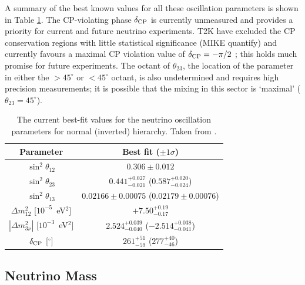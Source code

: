 A summary of the best known values for all these oscillation parameters is shown in Table \ref{tab:OscillationParameters}.  The CP-violating phase $\delta_{\textnormal{CP}}$ is currently unmeasured and provides a priority for current and future neutrino experiments.  T2K have excluded the CP conservation regions with little statistical significance (MIKE quantify) and currently favours a maximal CP violation value of $\delta_{\textnormal{CP}} = -\pi/2$ \cite{T2K2017}; this holds much promise for future experiments.  The octant of $\theta_{23}$, the location of the parameter in either the $> 45^{\circ}$ or $< 45^{\circ}$ octant, is also undetermined and requires high precision measurements; it is possible that the mixing in this sector is `maximal' ($\theta_{23} = 45^{\circ}$).

\begin{table}
  \caption[The current best-fit values for the neutrino oscillation parameters for normal and inverted hierarchies.]{The current best-fit values for the neutrino oscillation parameters for normal (inverted) hierarchy.  Taken from \cite{NuFit2017}.}
  \label{tab:OscillationParameters}
  \centering
    \begin{tabular}{c c}
      \toprule
      Parameter & Best fit ($\pm 1\sigma$) \\
      \midrule
      $\sin^2{\theta_{12}}$ & $0.306\pm0.012$ \\
      $\sin^2{\theta_{23}}$ & $0.441^{+0.027}_{-0.021}$ ($0.587^{+0.020}_{-0.024}$) \\
      $\sin^2{\theta_{13}}$ & $0.02166\pm0.00075$ ($0.02179\pm0.00076$) \\
      \midrule
      $\Delta m_{12}^2$ [$10^{-5}$~eV$^2$]     & $+7.50^{+0.19}_{-0.17}$ \\
      $|\Delta m_{3\nu}^2|$ [$10^{-3}$~eV$^2$] & $2.524^{+0.039}_{-0.040}$ ($-2.514^{+0.038}_{-0.041}$) \\
      \midrule
      $\delta_{\textnormal{CP}}$ [$^{\circ}$] & $261^{+51}_{-59}$ ($277^{+40}_{-46}$) \\
      \bottomrule
    \end{tabular}
\end{table}

\subsection{Neutrino Mass}\label{sec:NeutrinoMass}


